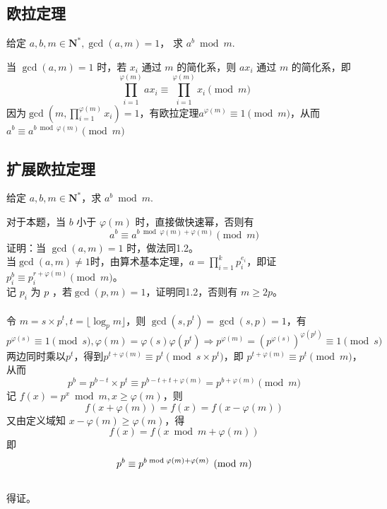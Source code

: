\documentclass[12pt,a4paper]{article}
\begin{document}
\subsection{欧拉定理}
\begin{mdframed}[leftline=true, linewidth=2pt, linecolor=gray]
	给定 $a,b,m\in \mathbf{N^*},\gcd(a,m)=1$， 求 $a^b\bmod{m}$.
\end{mdframed}
当 $\gcd(a,m)=1$ 时，若 $x_i$ 通过 $m$ 的简化系，则 $ax_i$ 通过 $m$ 的简化系，即\begin{equation*}
	\displaystyle\prod^{\varphi(m)}_{i=1}ax_i\equiv\prod^{\varphi(m)}_{i=1}x_i\pmod{m}
\end{equation*}
因为$\displaystyle\gcd(m,\prod^{\varphi(m)}_{i=1}x_i)=1$，有欧拉定理$a^{\varphi(m)}\equiv1\pmod{m}$，从而 $a^b\equiv a^{b\bmod{\varphi(m)}}\pmod{m}$
\subsection{扩展欧拉定理}
\begin{mdframed}[leftline=true, linewidth=2pt, linecolor=gray]
	给定 $a,b,m\in \mathbf{N^*}$，求 $a^b\bmod{m}$.
\end{mdframed}
对于本题，当 $b$ 小于 $\varphi(m)$ 时，直接做快速幂，否则有
\begin{equation*}
	\displaystyle a^b\equiv a^{b\bmod{\varphi(m)}+\varphi(m)}\pmod{m}
\end{equation*}
证明：当 $\gcd(a,m)=1$ 时，做法同1.2。\\
当$\gcd(a,m)\neq1$时，由算术基本定理，$\displaystyle a=\prod_{i=1}^{k}p_i^{e_i}$，即证 $p_i^b\equiv p_i^{r+\varphi(m)}\pmod{m}$。\\记 $p_i$ 为 $p$ ，若$\gcd(p,m)=1$，证明同1.2，否则有 $m\ge 2p$。\\
\\
令 $m=s\times p^t,t=\lfloor\log_p{m}\rfloor$，则 $\gcd(s,p^t)=\gcd(s,p)=1$，有
\begin{equation*}
	p^{\varphi(s)}\equiv1\pmod{s},\varphi(m)=\varphi(s)\varphi(p^t)\Rightarrow p^{\varphi(m)}=(p^{\varphi(s)})^{\varphi(p^t)}\equiv1\pmod{s}
\end{equation*}
两边同时乘以$p^t$，得到$p^{t+\varphi(m)}\equiv p^t\pmod{s\times p^t}$，即 $p^{t+\varphi(m)}\equiv p^t\pmod{m}$，从而
\begin{equation*}
	\displaystyle p^b=p^{b-t}\times p^t\equiv p^{b-t+t+\varphi(m)}=p^{b+\varphi(m)}\pmod{m}
\end{equation*}
记 $f(x)=p^{x}\bmod{m},x\ge\varphi(m)$，则 \begin{equation*}
	f(x+\varphi(m))=f(x)=f(x-\varphi(m))
\end{equation*}
又由定义域知 $x-\varphi(m)\ge\varphi(m)$，得 
\begin{equation*}
	f(x)=f(x\bmod{m}+\varphi(m))
\end{equation*}
即
\begin{equation*}
	p^b\equiv p^{b\bmod{\varphi(m)}+\varphi(m)}\pmod{m}\\
\end{equation*} 
\\得证。
\end{document}

